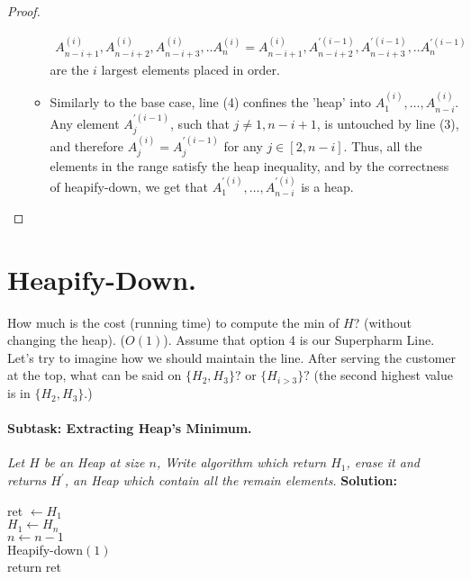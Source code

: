 \begin{proof}
\begin{enumerate}
\begin{itemize}
        \begin{equation*}
          \begin{split}
            A^{(i) }_{n-i+1},A^{(i) }_{n-i+2},A^{(i) }_{n-i+3},..A^{(i) }_{n} = A^{(i) }_{n-i+1},A^{\prime (i-1) }_{n-i+2},A^{\prime (i-1) }_{n-i+3},..A^{ \prime (i-1) }_{n}
          \end{split}
        \end{equation*}
        are the $i$ largest elements placed in order. 

       \item Similarly to the base case, line (4) confines the 'heap' into $A^{(i)}_{1}, \ldots, A^{(i)}_{n-i}$. Any element $A^{\prime (i-1)}_{j}$, such that $j \neq 1, n-i+1$, is untouched by line (3), and therefore $A^{(i)}_{j} = A^{\prime (i-1)}_{j}$ for any $j \in [2, n-i]$. Thus, all the elements in the range satisfy the heap inequality, and by the correctness of heapify-down, we get that $A^{\prime (i)}_{1}, \ldots, A^{\prime (i)}_{n-i}$ is a heap.

    \end{itemize}
\end{enumerate}
\end{proof}


\section{ Heapify-Down. }

How much is the cost (running time) to compute the min of $H$? (without changing the heap). ($O\left( 1 \right)$). Assume that option 4 is our Superpharm Line. Let's try to imagine how we should maintain the line. After serving the customer at the top, what can be said on $ \{ H_{2}, H_{3}\}$? or $\{H_{i>3}\}?$ (the second highest value is in $\{H_{2}, H_{3} \}$.)   
\paragraph{Subtask: Extracting Heap's Minimum.} \textit{Let $H$ be an Heap at size $n$, Write algorithm which return $H_1$, erase it and returns $H^\prime$, an Heap which contain all the remain elements.} 
\textbf{Solution:} 

\begin{algorithm}[H]
ret $\leftarrow H_{1} $ \\
$ H_{1} \leftarrow H_{n} $  \\
$ n \leftarrow n -1 $ \\
Heapify-down$\left( 1 \right)$ \\
return ret  
\end{algorithm}


